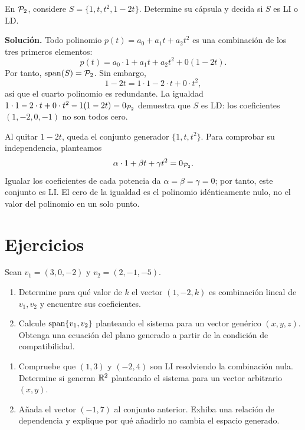 \documentclass[compacto,10pt]{pubciencias-notas}
\begin{document}
\begin{ejem}
    En $\mathcal{P}_2$, considere $S=\{1,t,t^2,1-2t\}$.
    Determine su cápsula y decida si $S$ es LI o LD.

    \textbf{Solución.} Todo polinomio $p(t)=a_0+a_1t+a_2t^2$ es una
    combinación de los tres primeros elementos:
    \[
        p(t)=a_0\cdot1+a_1t+a_2t^2+0(1-2t).
    \]
    Por tanto, $\operatorname{span}(S)=\mathcal{P}_2$. Sin embargo,
    \[
        1-2t=1\cdot1-2\cdot t+0\cdot t^2,
    \]
    así que el cuarto polinomio es redundante. La igualdad
    $1\cdot1-2\cdot t+0\cdot t^2-1(1-2t)=0_{\mathcal{P}_2}$ demuestra que
    $S$ es LD: los coeficientes $(1,-2,0,-1)$ no son todos cero.

    Al quitar $1-2t$, queda el conjunto generador $\{1,t,t^2\}$.
    Para comprobar su independencia, planteamos
    \[
        \alpha\cdot1+\beta t+\gamma t^2=0_{\mathcal{P}_2}.
    \]
    Igualar los coeficientes de cada potencia da
    $\alpha=\beta=\gamma=0$; por tanto, este conjunto es LI.
    El cero de la igualdad es el polinomio idénticamente nulo,
    no el valor del polinomio en un solo punto.
\end{ejem}
\section{Ejercicios}

\begin{ejer}
    Sean $v_1=(3,0,-2)$ y $v_2=(2,-1,-5)$.
    \begin{enumerate}
        \item Determine para qué valor de $k$ el vector $(1,-2,k)$ es
              combinación lineal de $v_1,v_2$ y encuentre sus coeficientes.
        \item Calcule $\operatorname{span}\{v_1,v_2\}$ planteando el sistema para un
              vector genérico $(x,y,z)$. Obtenga una ecuación del plano
              generado a partir de la condición de compatibilidad.
    \end{enumerate}
\end{ejer}

\begin{ejer}
    \begin{enumerate}
        \item Compruebe que $(1,3)$ y $(-2,4)$ son LI resolviendo la
              combinación nula. Determine si generan $\mathbb{R}^2$ planteando
              el sistema para un vector arbitrario $(x,y)$.
        \item Añada el vector $(-1,7)$ al conjunto anterior. Exhiba una
              relación de dependencia y explique por qué añadirlo no
              cambia el espacio generado.
    \end{enumerate}
\end{ejer}
\end{document}

